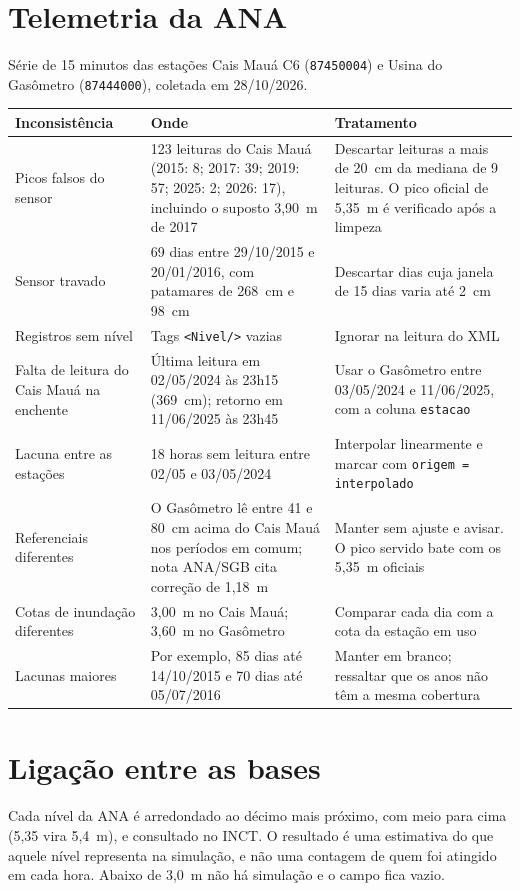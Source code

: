 \documentclass[11pt,a4paper]{article}
\begin{document}
\section{Telemetria da ANA}
Série de 15 minutos das estações Cais Mauá C6 (\texttt{87450004}) e Usina do Gasômetro (\texttt{87444000}), coletada em 28/10/2026.

\begin{longtable}{p{4.2cm} p{5.6cm} p{5.6cm}}
\toprule
Inconsistência & Onde & Tratamento\\
\midrule
\endhead
Picos falsos do sensor & 123 leituras do Cais Mauá (2015: 8; 2017: 39; 2019: 57; 2025: 2; 2026: 17), incluindo o suposto 3,90~m de 2017 & Descartar leituras a mais de 20~cm da mediana de 9 leituras. O pico oficial de 5,35~m é verificado após a limpeza\\
Sensor travado & 69 dias entre 29/10/2015 e 20/01/2016, com patamares de 268~cm e 98~cm & Descartar dias cuja janela de 15 dias varia até 2~cm\\
Registros sem nível & Tags \texttt{<Nivel/>} vazias & Ignorar na leitura do XML\\
Falta de leitura do Cais Mauá na enchente & Última leitura em 02/05/2024 às 23h15 (369~cm); retorno em 11/06/2025 às 23h45 & Usar o Gasômetro entre 03/05/2024 e 11/06/2025, com a coluna \texttt{estacao}\\
Lacuna entre as estações & 18 horas sem leitura entre 02/05 e 03/05/2024 & Interpolar linearmente e marcar com \texttt{origem = interpolado}\\
Referenciais diferentes & O Gasômetro lê entre 41 e 80~cm acima do Cais Mauá nos períodos em comum; nota ANA/SGB cita correção de 1,18~m & Manter sem ajuste e avisar. O pico servido bate com os 5,35~m oficiais\\
Cotas de inundação diferentes & 3,00~m no Cais Mauá; 3,60~m no Gasômetro & Comparar cada dia com a cota da estação em uso\\
Lacunas maiores & Por exemplo, 85 dias até 14/10/2015 e 70 dias até 05/07/2016 & Manter em branco; ressaltar que os anos não têm a mesma cobertura\\
\bottomrule
\end{longtable}

\section{Ligação entre as bases}
Cada nível da ANA é arredondado ao décimo mais próximo, com meio para cima (5,35 vira 5,4~m), e consultado no INCT. O resultado é uma estimativa do que aquele nível representa na simulação, e não uma contagem de quem foi atingido em cada hora. Abaixo de 3,0~m não há simulação e o campo fica vazio.
\end{document}
